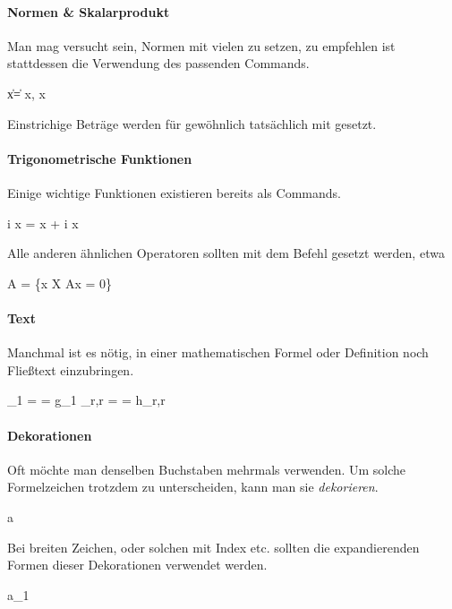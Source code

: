 \paragraph{Normen \& Skalarprodukt} Man mag versucht sein, Normen mit vielen \key{|} zu setzen, zu empfehlen ist stattdessen die Verwendung des passenden Commands.
\begin{latexlisting}
	\|x\| = \langle x, x \rangle
\end{latexlisting}
Einstrichige Beträge werden für gewöhnlich tatsächlich mit \key{|} gesetzt.

\paragraph{Trigonometrische Funktionen} Einige wichtige Funktionen existieren bereits als Commands.
\begin{latexlisting}
	\exp i x = \sin x + i \cos x
\end{latexlisting}
Alle anderen ähnlichen Operatoren sollten mit dem Befehl  gesetzt werden, etwa
\begin{latexlisting}
	 A = \{x \in X \mid Ax = 0\}
\end{latexlisting}

\paragraph{Text} Manchmal ist es nötig, in einer mathematischen Formel oder Definition noch Fließtext einzubringen.
\begin{latexlisting}
	_1 =  = g_1 \quad {}\quad {}_{r,r} =  = h_{r,r}
\end{latexlisting}

\paragraph{Dekorationen} Oft möchte man denselben Buchstaben mehrmals verwenden.
Um solche Formelzeichen trotzdem zu unterscheiden, kann man sie \emph{dekorieren}.
\begin{latexlisting}
	a \neq {} \neq {} \neq {}
\end{latexlisting}
Bei breiten Zeichen, oder solchen mit Index etc. sollten die expandierenden Formen dieser Dekorationen verwendet werden.
\begin{latexlisting}
	a_1 \neq {} \neq {} \neq {}
\end{latexlisting}

